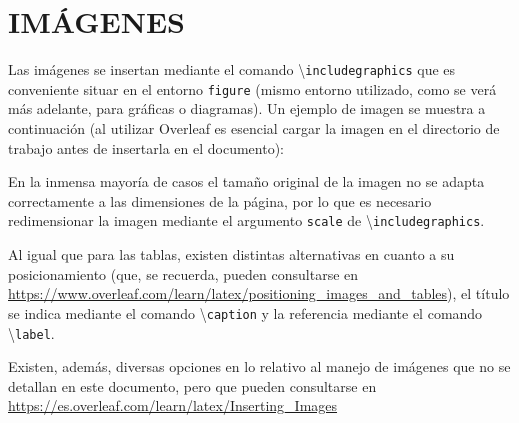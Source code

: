 
\section{IMÁGENES} \label{sec:imagenes}

Las imágenes se insertan mediante el comando \textbackslash\texttt{includegraphics} que es conveniente situar en el entorno \texttt{figure} (mismo entorno utilizado, como se verá más adelante, para gráficas o diagramas). Un ejemplo de imagen se muestra a continuación (al utilizar Overleaf es esencial cargar la imagen en el directorio de trabajo antes de insertarla en el documento): 

\vspace{10pt}


En la inmensa mayoría de casos el tamaño original de la imagen no se adapta correctamente a las dimensiones de la página, por lo que es necesario redimensionar la imagen mediante el argumento \texttt{scale} de \textbackslash\texttt{includegraphics}. 

Al igual que para las tablas, existen distintas alternativas en cuanto a su posicionamiento (que, se recuerda, pueden consultarse en \url{https://www.overleaf.com/learn/latex/positioning_images_and_tables}), el título se indica mediante el comando \textbackslash\texttt{caption} y la referencia mediante el comando \textbackslash\texttt{label}. 

Existen, además, diversas opciones en lo relativo al manejo de imágenes que no se detallan en este documento, pero que pueden consultarse en \url{https://es.overleaf.com/learn/latex/Inserting_Images} 
